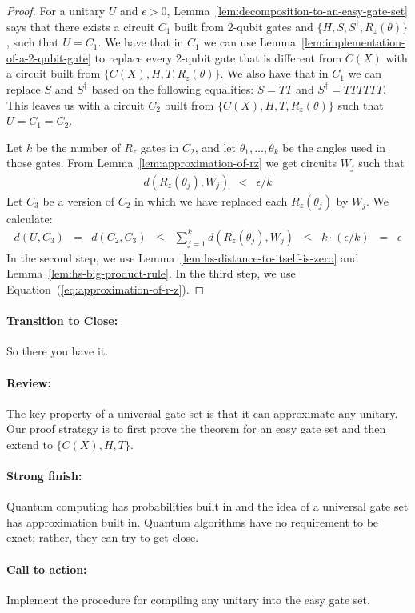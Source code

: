 \documentclass[11pt]{article}
\def\({\begin{eqnarray*}}
\def\){\end{eqnarray*}}
\begin{document}
\begin{proof}
For a unitary $U$ and $\epsilon > 0$,
Lemma~\ref{lem:decomposition-to-an-easy-gate-set} says that
there exists a circuit $C_1$ built from 2-qubit gates and
$\{H, S, S^\dagger, R_z(\theta)\}$, 
such that $U = C_1$.
We have that in $C_1$
we can use Lemma~\ref{lem:implementation-of-a-2-qubit-gate} 
to replace every 2-qubit gate that is different from $C(X)$ with
a circuit built from $\{C(X), H, T, R_z(\theta)\}$.
We also have that in $C_1$ we can replace $S$ and $S^\dagger$ based on
the following equalities:
$S = T T$ and $S^\dagger = T T T T T T$.
This leaves us with a circuit $C_2$ built from 
$\{C(X), H, T, R_z(\theta)\}$ 
such that $U = C_1 = C_2$.

Let $k$ be the number of $R_z$ gates in $C_2$, and
let $\theta_1, \ldots, \theta_k$ be the angles used in those gates.
From Lemma~\ref{lem:approximation-of-rz} we get circuits $W_j$ such that
\begin{eqnarray}
d(R_z(\theta_j),W_j) &<& \epsilon/k
\label{eq:approximation-of-r-z}
\end{eqnarray}
Let $C_3$ be a version of $C_2$ in which we have replaced
each $R_z(\theta_j)$ by $W_j$.
We calculate:
\(
d(U, C_3) &=& 
d(C_2, C_3) \;\;\leq\;\;
\sum_{j=1}^k d(R_z(\theta_j),W_j) \;\;\leq\;\;
k \cdot (\epsilon/k) \;\;=\;\; 
\epsilon
\)
In the second step, we use 
Lemma~\ref{lem:hs-distance-to-itself-is-zero} and
Lemma~\ref{lem:hs-big-product-rule}.
In the third step, we use Equation~(\ref{eq:approximation-of-r-z}).
\end{proof}


\paragraph{Transition to Close:} 
So there you have it.

\paragraph{Review:}
The key property of a universal gate set is that 
it can approximate any unitary.
Our proof strategy is to first prove the theorem for an easy gate set and then
extend to $\{C(X), H, T\}$.

\paragraph{Strong finish:}
Quantum computing has probabilities built in and
the idea of a universal gate set has approximation built in.
Quantum algorithms have no requirement to be exact; 
rather, they can try to get close.

\paragraph{Call to action:}
Implement the procedure for compiling any unitary into the easy gate set.
\end{document}
